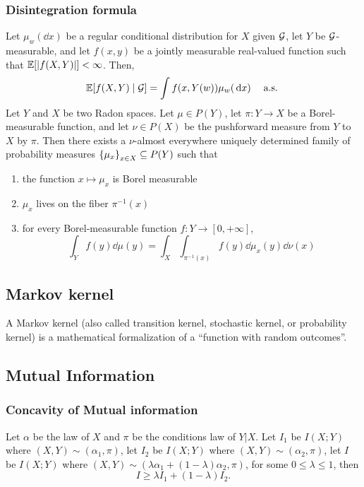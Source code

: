 \documentclass[10pt]{article}
\begin{document}
\subsubsection{Disintegration formula}
 Let $\mu_w (\dd{x})$ be a regular conditional distribution for $X$ given $\mathcal{G}$, let $Y$ be $\mathcal{G}$-measurable, and let $f(x,y)$ be a jointly measurable real-valued function such that $\mathop{\mathbb{E} \displaystyle}[ |f (X,Y)|] < \infty$. Then, 
\begin{equation}
    \E[f(X,Y) \given \cG] = \int f(x, Y(w)) \mu_w (\dd{x}) \quad \mtext{a.s.}
\end{equation}
 Let $Y$ and $X$ be two Radon spaces. Let $\mu \in P(Y)$, let $\pi: Y \to X$ be a Borel-measurable function, and let $\nu \in P(X)$ be the pushforward measure from $Y$ to $X$ by $\pi$. Then there exists a $\nu$-almost everywhere uniquely determined family of probability measures $\left\{ \mu_x \right\}_{x \in X} \subseteq P(Y)$ such that 
\begin{enumerate}
    \item the function $x \mapsto \mu_x$ is Borel measurable 
    \item $\mu_x$ lives on the fiber $\pi^{-1}(x)$
    \item for every Borel-measurable function $f: Y \to [0, + \infty]$, 
    \begin{equation}
        \int_Y f(y) \dd{\mu(y)} = \int_X \int_{\pi^{-1}(x)} f(y) \dd{ \mu_x(y)} \dd \nu(x) 
    \end{equation}
\end{enumerate}
\subsection{Markov kernel}
A Markov kernel (also called transition kernel, stochastic kernel, or probability kernel) is a mathematical formalization of a “function with random outcomes”.
\subsection{Mutual Information}
\subsubsection{Concavity of Mutual information}
Let $\alpha$ be the law of $X$ and $\pi$ be the conditions law of $Y|X$.  Let \( I_1 \) be \( I(X;Y) \) where \( (X,Y) \sim (\alpha_1, \pi) \),  
let \( I_2 \) be \( I(X;Y) \) where \( (X,Y) \sim (\alpha_2, \pi) \),  
let \( I \) be \( I(X;Y) \) where \( (X,Y) \sim (\lambda \alpha_1 + (1-\lambda) \alpha_2, \pi) \),  
for some \( 0 \leq \lambda \leq 1 \), then  
\[
I \geq \lambda I_1 + (1-\lambda) I_2.
\]
\end{document}
